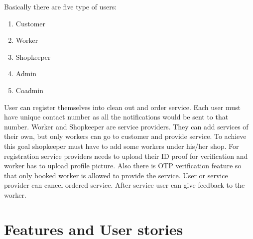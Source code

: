 \documentclass[conference]{IEEEtran}
\begin{document}
Basically there are five type of users:
\begin{enumerate}
    \item Customer
    \item Worker
    \item Shopkeeper
    \item Admin
    \item Coadmin \\
\end{enumerate}

User can register themselves into clean out and order service. Each user must have unique contact number as all the notifications would be sent to that number. Worker and Shopkeeper are service providers. They can add services of their own, but only workers can go to customer and provide service. To achieve this goal shopkeeper must have to add some workers under his/her shop. For registration service providers needs to upload their ID proof for verification and worker has to upload profile picture. Also there is OTP verification feature so that only booked worker is allowed to provide the service. User or service provider can cancel ordered service. After service user can give feedback to the worker.\\





\section{Features and User stories}
\end{document}
